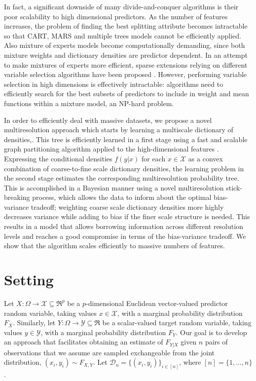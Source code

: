\documentclass{article} %
\providecommand{\mc}[1]{\mathcal{#1}}
\newcommand{\from}{{\ensuremath{\colon}}}  %
\begin{document}
In fact, a significant downside of many divide-and-conquer algorithms is their poor scalability to high dimensional predictors. As the number of features increases, the problem of finding the best splitting attribute becomes intractable so that CART, MARS and multiple trees models cannot be efficiently applied. Also mixture of experts models become computationally demanding, since both mixture weights and dictionary densities are predictor dependent. In an attempt to make mixtures of experts more efficient, sparse extensions relying on different variable selection algorithms have been proposed \cite{SparseMoF}. However, performing variable selection in high dimensions is effectively intractable: algorithms need to efficiently search for the best subsets of predictors to include in weight and mean functions within a mixture model, an NP-hard problem.

 In order to efficiently deal with massive datasets, we propose a novel multiresolution approach which starts by learning a multiscale dictionary of densities,. This tree is efficiently learned in a first stage using a fast and scalable graph partitioning algorithm applied to the high-dimensional features \cite{metis}.  Expressing the conditional densities $f(y|x)$ for each $x \in \mathcal{X}$ as a convex combination of coarse-to-fine scale dictionary densities, the learning problem in the second stage estimates the corresponding multiresolution probability tree.  This is accomplished in a Bayesian manner using a novel multiresolution stick-breaking process, which allows the data to inform about the optimal bias-variance tradeoff; weighting coarse scale dictionary densities more highly decreases variance while adding to bias if the finer scale structure is needed.  This results in a model that allows borrowing information across different resolution levels and reaches a good compromise in terms of the bias-variance tradeoff. We show that the algorithm scales efficiently to massive numbers of features. 


\section{Setting} \label{section:setting}
Let $X \from \Omega \to \mc{X} \subseteq \Re^p$ be a 
$p$-dimensional Euclidean vector-valued predictor random variable, taking values $x \in \mc{X}$, with a marginal probability distribution $F_X$.  
Similarly, let $Y \from \Omega \to \mc{Y} \subseteq \Re$ be a 
scalar-valued target random variable, taking values $y \in \mc{Y}$, with a marginal probability distribution $F_Y$.  Our goal is to develop an approach that facilitates obtaining an estimate of $F_{Y|X}$ given $n$ pairs of observations that we assume are sampled exchangeable from the joint distribution, $(x_i,y_i) \sim F_{X,Y}$. Let $\mc{D}_n=\{(x_i,y_i)\}_{i \in [n]}$, where $[n]=\{1,\ldots, n\}$.
\end{document}
